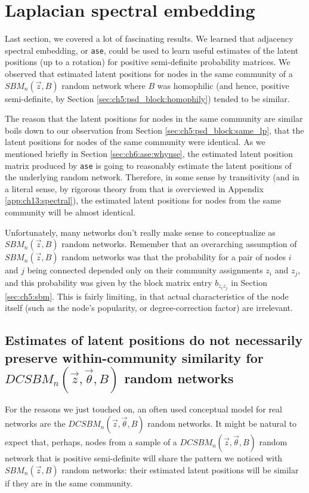\section{Laplacian spectral embedding}
\label{sec:ch6:lse}

Last section, we covered a lot of fascinating results. We learned that adjacency spectral embedding, or \texttt{ase}, could be used to learn useful estimates of the latent positions (up to a rotation) for positive semi-definite probability matrices. We observed that estimated latent positions for nodes in the same community of a $SBM_n(\vec z, B)$ random network where $B$ was homophilic (and hence, positive semi-definite, by Section \ref{sec:ch5:psd_block:homophily}) tended to be similar. 

The reason that the latent positions for nodes in the same community are similar boils down to our observation from Section \ref{sec:ch5:psd_block:same_lp}, that the latent positions for nodes of the same community were identical. As we mentioned briefly in Section \ref{sec:ch6:ase:whyuse}, the estimated latent position matrix produced by \texttt{ase} is going to reasonably estimate the latent positions of the underlying random network. Therefore, in some sense by transitivity (and in a literal sense, by rigorous theory from \cite{Athreya2017Jan} that is overviewed in Appendix \ref{app:ch13:spectral}), the estimated latent positions for nodes from the same community will be almost identical.

Unfortunately, many networks don't really make sense to conceptualize as $SBM_n(\vec z, B)$ random networks. Remember that an overarching assumption of $SBM_n(\vec z, B)$ random networks was that the probability for a pair of nodes $i$ and $j$ being connected depended only on their community assignments $z_i$ and $z_j$, and this probability was given by the block matrix entry $b_{z_i z_j}$ in Section \ref{sec:ch5:sbm}. This is fairly limiting, in that actual characteristics of the node itself (such as the node's popularity, or degree-correction factor) are irrelevant.

\subsection{Estimates of latent positions do not necessarily preserve within-community similarity for $DCSBM_n(\vec z, \vec \theta, B)$ random networks}

For the reasons we just touched on, an often used conceptual model for real networks are the $DCSBM_n(\vec z, \vec \theta, B)$ random networks. It might be natural to expect that, perhaps, nodes from a sample of a $DCSBM_n(\vec z, \vec \theta, B)$ random network that is positive semi-definite will share the pattern we noticed with $SBM_n(\vec z, B)$ random networks: their estimated latent positions will be similar if they are in the same community. 


